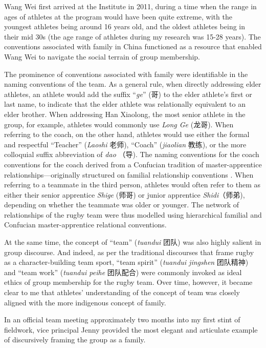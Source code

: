 \begin{CJK}{UTF8}{gbsn}
Wang Wei first arrived at the Institute in 2011, during a time when the range in ages of athletes at the program would have been quite extreme, with the youngest athletes being around 16 years old, and the oldest athletes being in their mid 30s (the age range of athletes during my research was 15-28 years).  The conventions associated with family in China functioned as a resource that enabled Wang Wei to navigate the social terrain of group membership.

The prominence of conventions associated with family were identifiable in the naming conventions of the team.  As a general rule, when directly addressing elder athletes, an athlete would add the suffix ``\textit{ge}'' (哥) to the elder athlete's first or last name, to indicate that the elder athlete was relationally equivalent to an elder brother.  When addressing Han Xiaolong, the most senior athlete in the group, for example, athletes would commonly use \textit{Long Ge} (龙哥).  When referring to the coach, on the other hand, athletes would use either the formal and respectful ``Teacher'' (\textit{Laoshi} 老师), ``Coach'' (\textit{jiaolian} 教练), or the more colloquial suffix abbreviation of \textit{dao} （导). The naming conventions for the coach conventions for the coach derived from a Confucian tradition of master-apprentice relationships---originally structured on familial relationship conventions \citep{Spence1999}. When referring to a teammate in the third person, athletes would often refer to them as either their senior apprentice \textit{Shige} (师哥) or junior apprentice \textit{Shidi}（师弟), depending on whether the teammate was older or younger.  The network of relationships of the rugby team were thus modelled using hierarchical familial and Confucian master-apprentice relational conventions.

At the same time, the concept of ``team'' (\textit{tuandui} 团队) was also highly salient in group discourse. And indeed, as per the traditional discourses that frame rugby as a character-building team sport, ``team spirit'' (\textit{tuandui jingshen} 团队精神) and ``team work'' (\textit{tuandui peihe} 团队配合) were commonly invoked as ideal ethics of group membership for the rugby team.   Over time, however, it became clear to me that athletes' understanding of the concept of team was closely aligned with the more indigenous concept of family.

In an official team meeting approximately two months into my first stint of fieldwork, vice principal Jenny provided the most elegant and articulate example of discursively framing the group as a family.


\end{CJK}
